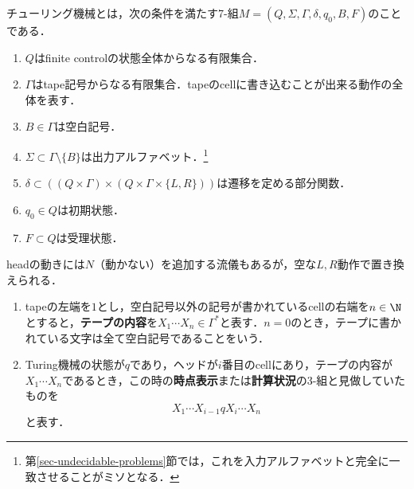 \begin{definition}
    チューリング機械とは，次の条件を満たす7-組$M=(Q,\Sigma,\Gamma,\delta,q_0,B,F)$のことである．
    \begin{enumerate}
        \item $Q$はfinite controlの状態全体からなる有限集合．
        \item $\Gamma$はtape記号からなる有限集合．tapeのcellに書き込むことが出来る動作の全体を表す．
        \item $B\in\Gamma$は空白記号．
        \item $\Sigma\subset\Gamma\setminus\{B\}$は出力アルファベット．\footnote{第\ref{sec-undecidable-problems}節では，これを入力アルファベットと完全に一致させることがミソとなる．}
        \item $\delta\subset((Q\times\Gamma)\times(Q\times\Gamma\times\{L,R\}))$は遷移を定める部分関数．
        \item $q_0\in Q$は初期状態．
        \item $F\subset Q$は受理状態．
    \end{enumerate}
\end{definition}
\begin{remark}
    headの動きには$N$（動かない）を追加する流儀もあるが，空な$L,R$動作で置き換えられる．
\end{remark}

\begin{definition}\mbox{}
    \begin{enumerate}
        \item tapeの左端を$1$とし，空白記号以外の記号が書かれているcellの右端を$n\in\N$とすると，\textbf{テープの内容}を$X_1\cdots X_n\in\Gamma^*$と表す．$n=0$のとき，テープに書かれている文字は全て空白記号であることをいう．
        \item Turing機械の状態が$q$であり，ヘッドが$i$番目のcellにあり，テープの内容が$X_1\cdots X_n$であるとき，この時の\textbf{時点表示}または\textbf{計算状況}の3-組と見做していたものを
        \[X_1\cdots X_{i-1}qX_{i}\cdots X_n\]
        と表す．
    \end{enumerate}
\end{definition}


